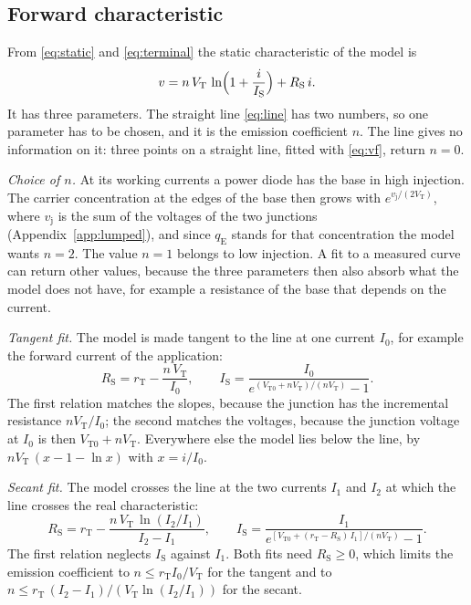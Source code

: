 \documentclass[10pt,a4paper]{scrartcl}
\newcommand{\qE}{q_\mathrm{E}}
\newcommand{\vj}{v_\mathrm{j}}
\newcommand{\IS}{I_\mathrm{S}}
\newcommand{\RS}{R_\mathrm{S}}
\newcommand{\VT}{V_\mathrm{T}}
\newcommand{\VTo}{V_\mathrm{T0}}
\newcommand{\rT}{r_\mathrm{T}}
\begin{document}
\subsection{Forward characteristic}
\label{sec:forward}
From \eqref{eq:static} and \eqref{eq:terminal} the static characteristic of the model is
\begin{equation}
v = n\,\VT\,\ln\Bigl(1 + \frac{i}{\IS}\Bigr) + \RS\, i .
\label{eq:vf}
\end{equation}
It has three parameters. The straight line \eqref{eq:line} has two numbers, so one parameter has to be chosen, and it is the emission coefficient $n$. The line gives no information on it: three points on a straight line, fitted with \eqref{eq:vf}, return $n = 0$.

\emph{Choice of $n$.} At its working currents a power diode has the base in high injection. The carrier concentration at the edges of the base then grows with $e^{\vj/(2\VT)}$, where $\vj$ is the sum of the voltages of the two junctions (Appendix~\ref{app:lumped}), and since $\qE$ stands for that concentration the model wants $n = 2$. The value $n = 1$ belongs to low injection. A fit to a measured curve can return other values, because the three parameters then also absorb what the model does not have, for example a resistance of the base that depends on the current.

\emph{Tangent fit.} The model is made tangent to the line at one current $I_0$, for example the forward current of the application:
\begin{equation}
\RS = \rT - \frac{n\,\VT}{I_0} , \qquad \IS = \frac{I_0}{e^{(\VTo + n\VT)/(n\VT)} - 1} .
\label{eq:tangent}
\end{equation}
The first relation matches the slopes, because the junction has the incremental resistance $n\VT/I_0$; the second matches the voltages, because the junction voltage at $I_0$ is then $\VTo + n\VT$. Everywhere else the model lies below the line, by $n\VT\,(x - 1 - \ln x)$ with $x = i/I_0$.

\emph{Secant fit.} The model crosses the line at the two currents $I_1$ and $I_2$ at which the line crosses the real characteristic:
\begin{equation}
\RS = \rT - \frac{n\,\VT\,\ln(I_2/I_1)}{I_2 - I_1} , \qquad \IS = \frac{I_1}{e^{[\VTo + (\rT-\RS)\,I_1]/(n\VT)} - 1} .
\label{eq:secant}
\end{equation}
The first relation neglects $\IS$ against $I_1$. Both fits need $\RS \geq 0$, which limits the emission coefficient to $n \leq \rT I_0/\VT$ for the tangent and to $n \leq \rT\,(I_2-I_1)/(\VT\ln(I_2/I_1))$ for the secant.
\end{document}
